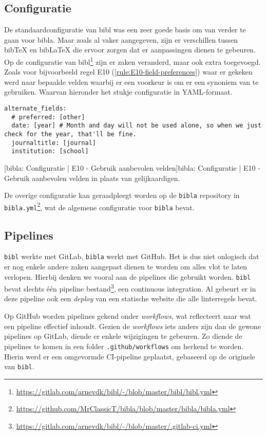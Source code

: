 \subsection{Configuratie}
De standaardconfiguratie van bibl was een zeer goede basis om van verder te gaan voor bibla. Maar zoals al vaker aangegeven, zijn er verschillen tussen bibTeX en bibLaTeX die ervoor zorgen dat er aanpassingen dienen te gebeuren. Op de configuratie van bibl\footnote{\url{https://gitlab.com/arnevdk/bibl/-/blob/master/bibl/bibl.yml}} zijn er zaken veranderd, maar ook extra toegevoegd. Zoals voor bijvoorbeeld regel E10 (\ref{rule:E10-field-preferences}) waar er gekeken werd naar bepaalde velden waarbij er een voorkeur is om er een synoniem van te gebruiken. Waarvan hieronder het stukje configuratie in YAML-formaat.


\begin{verbatim}
alternate_fields:
  # preferred: [other]
  date: [year] # Month and day will not be used alone, so when we just check for the year, that'll be fine.
  journaltitle: [journal]
  institution: [school]
\end{verbatim}
[bibla: Configuratie | E10 - Gebruik aanbevolen velden]{bibla: Configuratie | E10 - Gebruik aanbevolen velden in plaats van gelijkaardigen. \label{lst:bibla_AR_E00}}
   
De overige configuratie kan geraadpleegt worden op de \texttt{bibla} repository in \texttt{bibla.yml}\footnote{\url{https://github.com/MrClassicT/bibla/blob/master/bibla/bibla.yml}}, wat de algemene configuratie voor \texttt{bibla} bevat.

\subsection{Pipelines}
\texttt{bibl} werkte met GitLab, \texttt{bibla} werkt met GitHub. Het is dus niet onlogisch dat er nog enkele andere zaken aangepast dienen te worden om alles vlot te laten verlopen. Hierbij denken we vooral aan de pipelines die gebruikt worden. \texttt{bibl} bevat slechts één pipeline bestand\footnote{\url{https://gitlab.com/arnevdk/bibl/-/blob/master/.gitlab-ci.yml}}, een continuous integration. Al gebeurt er in deze pipeline ook een \emph{deploy} van een statische website die alle linterregels bevat.

Op GitHub worden pipelines gekend onder \emph{workflows}, wat reflecteert naar wat een pipeline effectief inhoudt. Gezien de \emph{workflows} iets anders zijn dan de gewone pipelines op GitLab, diende er enkele wijzigingen te gebeuren. Zo diende de pipelines te komen in een folder \texttt{.github/workflows} om herkend te worden. Hierin werd er een omgevormde CI-pipeline geplaatst, gebaseerd op de originele van \texttt{bibl}.

